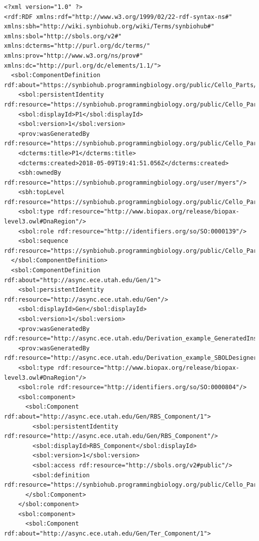\begin{lstlisting}
<?xml version="1.0" ?>
<rdf:RDF xmlns:rdf="http://www.w3.org/1999/02/22-rdf-syntax-ns#" xmlns:sbh="http://wiki.synbiohub.org/wiki/Terms/synbiohub#" xmlns:sbol="http://sbols.org/v2#" xmlns:dcterms="http://purl.org/dc/terms/" xmlns:prov="http://www.w3.org/ns/prov#" xmlns:dc="http://purl.org/dc/elements/1.1/">
  <sbol:ComponentDefinition rdf:about="https://synbiohub.programmingbiology.org/public/Cello_Parts/P1/1">
    <sbol:persistentIdentity rdf:resource="https://synbiohub.programmingbiology.org/public/Cello_Parts/P1"/>
    <sbol:displayId>P1</sbol:displayId>
    <sbol:version>1</sbol:version>
    <prov:wasGeneratedBy rdf:resource="https://synbiohub.programmingbiology.org/public/Cello_Parts/CelloUCF2sbol_Activity/1"/>
    <dcterms:title>P1</dcterms:title>
    <dcterms:created>2018-05-09T19:41:51.056Z</dcterms:created>
    <sbh:ownedBy rdf:resource="https://synbiohub.programmingbiology.org/user/myers"/>
    <sbh:topLevel rdf:resource="https://synbiohub.programmingbiology.org/public/Cello_Parts/P1/1"/>
    <sbol:type rdf:resource="http://www.biopax.org/release/biopax-level3.owl#DnaRegion"/>
    <sbol:role rdf:resource="http://identifiers.org/so/SO:0000139"/>
    <sbol:sequence rdf:resource="https://synbiohub.programmingbiology.org/public/Cello_Parts/P1_sequence/1"/>
  </sbol:ComponentDefinition>
  <sbol:ComponentDefinition rdf:about="http://async.ece.utah.edu/Gen/1">
    <sbol:persistentIdentity rdf:resource="http://async.ece.utah.edu/Gen"/>
    <sbol:displayId>Gen</sbol:displayId>
    <sbol:version>1</sbol:version>
    <prov:wasGeneratedBy rdf:resource="http://async.ece.utah.edu/Derivation_example_GeneratedInstance21_SBOLDesignerActivity/1"/>
    <prov:wasGeneratedBy rdf:resource="http://async.ece.utah.edu/Derivation_example_SBOLDesignerActivity/1"/>
    <sbol:type rdf:resource="http://www.biopax.org/release/biopax-level3.owl#DnaRegion"/>
    <sbol:role rdf:resource="http://identifiers.org/so/SO:0000804"/>
    <sbol:component>
      <sbol:Component rdf:about="http://async.ece.utah.edu/Gen/RBS_Component/1">
        <sbol:persistentIdentity rdf:resource="http://async.ece.utah.edu/Gen/RBS_Component"/>
        <sbol:displayId>RBS_Component</sbol:displayId>
        <sbol:version>1</sbol:version>
        <sbol:access rdf:resource="http://sbols.org/v2#public"/>
        <sbol:definition rdf:resource="https://synbiohub.programmingbiology.org/public/Cello_Parts/P1/1"/>
      </sbol:Component>
    </sbol:component>
    <sbol:component>
      <sbol:Component rdf:about="http://async.ece.utah.edu/Gen/Ter_Component/1">

\end{lstlisting}
